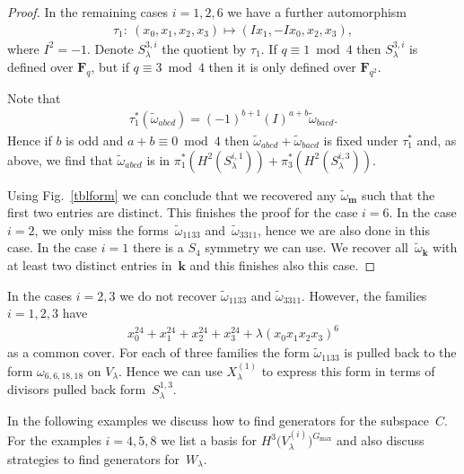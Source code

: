 \documentclass[pdftex]{sigma}
\numberwithin{equation}{section}
\begin{document}
\begin{proof}
In the remaining cases $i=1,2,6$ we have a further automorphism \begin{gather*}\tau_1\colon \ (x_0,x_1,x_2,x_3)\mapsto (Ix_1,-Ix_0,x_2,x_3),\end{gather*} where $I^2=-1$. Denote $S^{3,i}_{\lambda}$ the quotient by $\tau_1$. If $q\equiv 1\bmod 4$ then $S^{3,i}_\lambda$ is def\/ined over $\mathbf{F}_q$, but if $q\equiv 3 \bmod 4$ then it is only def\/ined over $\mathbf{F}_{q^2}$.

Note that \begin{gather*}\tau_1^*(\tilde{\omega}_{abcd})=(-1)^{b+1}(I)^{a+b} \tilde{\omega}_{bacd}.\end{gather*} Hence if $b$ is odd and $a+b\equiv 0 \bmod 4$ then $\tilde{\omega}_{abcd}+\tilde{\omega}_{bacd}$ is f\/ixed under $\tau_1^*$ and, as above, we f\/ind that $\tilde{\omega}_{abcd}$ is in $ \pi^*_1(H^2(S^{i,1}_{\lambda}))+\pi^*_3(H^2(S^{i,3}_{\lambda}))$.

Using Fig.~\ref{tblform} we can conclude that we recovered any $\tilde{\omega}_{\mathbf{m}}$ such that the f\/irst two entries are distinct. This f\/inishes the proof for the case $i=6$. In the case $i=2$, we only miss the forms~$\tilde{\omega}_{1133}$ and~$\tilde{\omega}_{3311}$, hence we are also done in this case. In the case $i=1$ there is a $S_4$ symmetry we can use. We recover all~$\tilde{\omega}_{\mathbf{k}}$ with at least two distinct entries in~$\mathbf{k}$ and this f\/inishes also this case.
\end{proof}

\begin{Remark} In the cases $i=2,3$ we do not recover $\tilde{\omega}_{1133}$ and $\tilde{\omega}_{3311}$. However, the families $i=1,2,3$ have
\begin{gather*} x_0^{24}+x_1^{24}+x_2^{24}+x_3^{24}+\lambda\left(x_0x_1x_2x_3\right)^6\end{gather*}
as a common cover. For each of three families the form $\tilde{\omega}_{1133}$ is pulled back to the form $\omega_{6,6,18,18}$ on $V_\lambda$. Hence we can use $X^{(1)}_\lambda$ to express this form in terms of divisors pulled back form~$S^{1,3}_{\lambda}$.
\end{Remark}

In the following examples we discuss how to f\/ind generators for the subspace~$C$. For the examples $i=4,5,8$ we list a basis for $H^3\big(V_\lambda^{(i)}\big)^{G_{\max}}$ and also discuss strategies to f\/ind generators for~$W_\lambda$.
\end{document}
